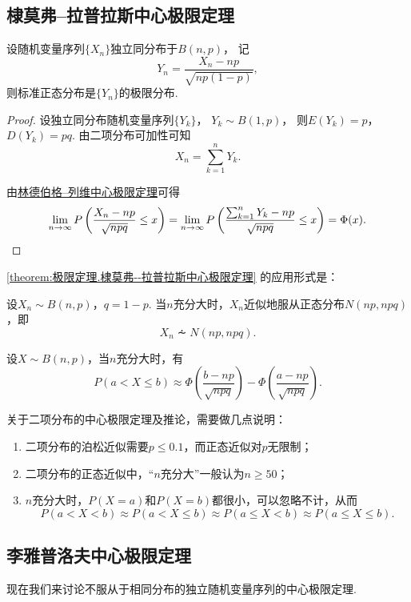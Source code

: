 \subsection{棣莫弗--拉普拉斯中心极限定理}
\begin{theorem}\label{theorem:极限定理.棣莫弗--拉普拉斯中心极限定理}
设随机变量序列\(\{X_n\}\)独立同分布于\(B(n,p)\)，
记\[
	Y_n = \frac{X_n - np}{\sqrt{np(1-p)}},
\]
则标准正态分布是\(\{Y_n\}\)的极限分布.
\begin{proof}
设独立同分布随机变量序列\(\{Y_k\}\)，
\(Y_k \sim B(1,p)\)，
则\(E(Y_k)=p\)，
\(D(Y_k)=pq\).
由二项分布可加性可知\[
	X_n = \sum_{k=1}^n Y_k.
\]

由\hyperref[theorem:极限定理.林德伯格--列维中心极限定理]{林德伯格--列维中心极限定理}可得\[
	\lim_{n\to\infty} P\left(\frac{X_n-np}{\sqrt{npq}} \leq x\right)
	= \lim_{n\to\infty} P\left(\frac{\sum_{k=1}^n{Y_k}-np}{\sqrt{npq}} \leq x\right)
	= \Phi(x).
	\qedhere
\]
\end{proof}
\end{theorem}

\cref{theorem:极限定理.棣莫弗--拉普拉斯中心极限定理} 的应用形式是：
\begin{corollary}
设\(X_n \sim B(n,p)\)，\(q = 1-p\).
当\(n\)充分大时，\(X_n\)近似地服从正态分布\(N(np,npq)\)，即\[
X_n \dotsim N(np,npq).
\]
\end{corollary}

\begin{corollary}
设\(X \sim B(n,p)\)，当\(n\)充分大时，有\[
P(a < X \leq b)
\approx \Phi\left(\frac{b-np}{\sqrt{npq}}\right) - \Phi\left(\frac{a-np}{\sqrt{npq}}\right).
\]
\end{corollary}

关于二项分布的中心极限定理及推论，需要做几点说明：
\begin{enumerate}
\item 二项分布的泊松近似需要\(p \leq 0.1\)，而正态近似对\(p\)无限制；
\item 二项分布的正态近似中，“\(n\)充分大”一般认为\(n \geq 50\)；
\item \(n\)充分大时，\(P(X=a)\)和\(P(X=b)\)都很小，可以忽略不计，从而\[
P(a < X < b)
\approx P(a < X \leq b)
\approx P(a \leq X < b)
\approx P(a \leq X \leq b).
\]
\end{enumerate}

\subsection{李雅普洛夫中心极限定理}
现在我们来讨论不服从于相同分布的独立随机变量序列的中心极限定理.

